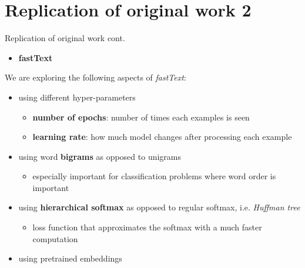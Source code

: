\documentclass[10pt,xcolor={table,dvipsnames},t]{beamer}
\begin{document}
\section{Replication of original work 2}
\begin{frame}{Replication of original work cont.}

    \begin{itemize}
        \item \textbf{fastText}
    \end{itemize}

    We are exploring the following aspects of \textit{fastText}:
    \begin{itemize}
        \item using different hyper-parameters
            \begin{itemize}
                \item \textbf{number of epochs}: number of times each examples is seen
                \item \textbf{learning rate}: how much model changes after processing each example
            \end{itemize}
        \item using word \textbf{bigrams} as opposed to unigrams
            \begin{itemize}
                \item especially important for classification problems where word order is important
            \end{itemize}
        \item using \textbf{hierarchical softmax} as opposed to regular softmax, i.e. \textit{Huffman tree}
            \begin{itemize}
                \item loss function that approximates the softmax with a much faster computation
            \end{itemize}
        \item using pretrained embeddings
    \end{itemize}

\end{frame}
\end{document}
